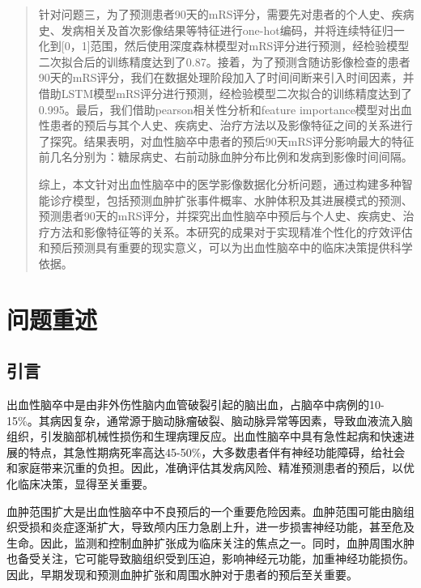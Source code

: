 \documentclass[bwprint]{gmcmthesis}
\begin{document}
\begin{abstract}
针对问题三，为了预测患者90天的mRS评分，需要先对患者的个人史、疾病史、发病相关及首次影像结果等特征进行one-hot编码，并将连续特征归一化到[0，1]范围，然后使用深度森林模型对mRS评分进行预测，经检验模型二次拟合后的训练精度达到了0.87。接着，为了预测含随访影像检查的患者90天的mRS评分，我们在数据处理阶段加入了时间间断来引入时间因素，并借助LSTM模型mRS评分进行预测，经检验模型二次拟合的训练精度达到了0.995。最后，我们借助pearson相关性分析和feature importance模型对出血性患者的预后与其个人史、疾病史、治疗方法以及影像特征之间的关系进行了探究。结果表明，对血性脑卒中患者的预后90天mRS评分影响最大的特征前几名分别为：糖尿病史、右前动脉血肿分布比例和发病到影像时间间隔。\par
综上，本文针对出血性脑卒中的医学影像数据化分析问题，通过构建多种智能诊疗模型，包括预测血肿扩张事件概率、水肿体积及其进展模式的预测、预测患者90天的mRS评分，并探究出血性脑卒中预后与个人史、疾病史、治疗方法和影像特征等的关系。本研究的成果对于实现精准个性化的疗效评估和预后预测具有重要的现实意义，可以为出血性脑卒中的临床决策提供科学依据。



\end{abstract}

\pagestyle{plain}

\maketoc

\clearpage

\section{问题重述}

\subsection{引言}   %

出血性脑卒中是由非外伤性脑内血管破裂引起的脑出血\cite{李立新2010缺血性和出血性脑卒中危险因素分析}，占脑卒中病例的10-15\%。其病因复杂，通常源于脑动脉瘤破裂、脑动脉异常等因素，导致血液流入脑组织，引发脑部机械性损伤和生理病理反应。出血性脑卒中具有急性起病和快速进展的特点，其急性期病死率高达45-50\%，大多数患者伴有神经功能障碍，给社会和家庭带来沉重的负担。因此，准确评估其发病风险、精准预测患者的预后，以优化临床决策，显得至关重要。

血肿范围扩大是出血性脑卒中不良预后的一个重要危险因素\cite{黄广苏2009脑出血早期血肿扩大的研究进展,吴智平2004脑出血后血肿扩大}。血肿范围可能由脑组织受损和炎症逐渐扩大，导致颅内压力急剧上升，进一步损害神经功能，甚至危及生命。因此，监测和控制血肿扩张成为临床关注的焦点之一。同时，血肿周围水肿也备受关注，它可能导致脑组织受到压迫，影响神经元功能，加重神经功能损伤。因此，早期发现和预测血肿扩张和周围水肿对于患者的预后至关重要。
\end{document}
